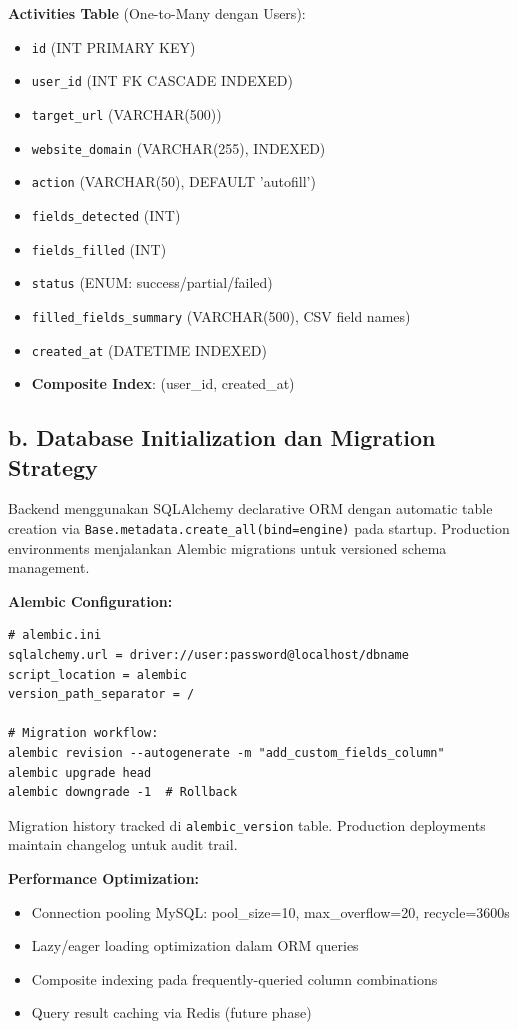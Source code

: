 \documentclass[12pt,a4paper]{article}
\begin{document}
\textbf{Activities Table} (One-to-Many dengan Users):
\begin{itemize}
  \item \texttt{id} (INT PRIMARY KEY)
  \item \texttt{user\_id} (INT FK CASCADE INDEXED)
  \item \texttt{target\_url} (VARCHAR(500))
  \item \texttt{website\_domain} (VARCHAR(255), INDEXED)
  \item \texttt{action} (VARCHAR(50), DEFAULT 'autofill')
  \item \texttt{fields\_detected} (INT)
  \item \texttt{fields\_filled} (INT)
  \item \texttt{status} (ENUM: success/partial/failed)
  \item \texttt{filled\_fields\_summary} (VARCHAR(500), CSV field names)
  \item \texttt{created\_at} (DATETIME INDEXED)
  \item \textbf{Composite Index}: (user\_id, created\_at)
\end{itemize}

\subsection*{b. Database Initialization dan Migration Strategy}

Backend menggunakan SQLAlchemy declarative ORM dengan automatic table creation via \texttt{Base.metadata.create\_all(bind=engine)} pada startup. Production environments menjalankan Alembic migrations untuk versioned schema management.

\textbf{Alembic Configuration:}

\begin{lstlisting}
# alembic.ini
sqlalchemy.url = driver://user:password@localhost/dbname
script_location = alembic
version_path_separator = /

# Migration workflow:
alembic revision --autogenerate -m "add_custom_fields_column"
alembic upgrade head
alembic downgrade -1  # Rollback
\end{lstlisting}

Migration history tracked di \texttt{alembic\_version} table. Production deployments maintain changelog untuk audit trail.

\textbf{Performance Optimization:}
\begin{itemize}
  \item Connection pooling MySQL: pool\_size=10, max\_overflow=20, recycle=3600s
  \item Lazy/eager loading optimization dalam ORM queries
  \item Composite indexing pada frequently-queried column combinations
  \item Query result caching via Redis (future phase)
\end{itemize}
\end{document}
